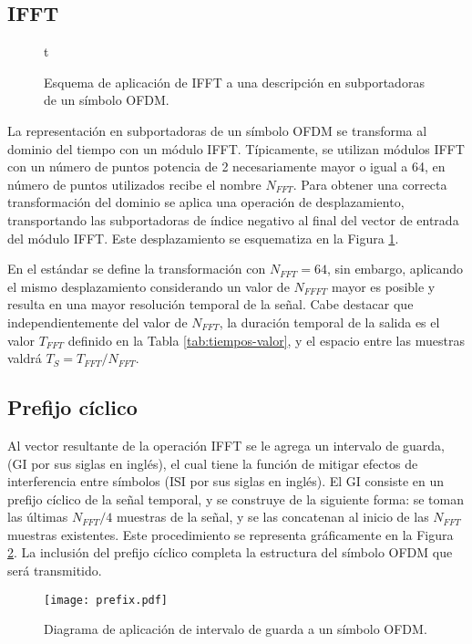 \subsection{IFFT}
\label{Ss:ch2-ifft}

\begin{figure}{t}
    \centering
    \hfill
    \hfill
    \caption{Esquema de aplicación de IFFT a una descripción en subportadoras de un símbolo OFDM.\label{fig:ifft}}
    \hfill
\end{figure}

La representación en subportadoras de un símbolo OFDM se transforma al dominio del tiempo con un módulo IFFT. Típicamente, se utilizan módulos IFFT con un número de puntos potencia de 2 necesariamente mayor o igual a 64, en número de puntos utilizados recibe el nombre $N_{FFT}$. Para obtener una correcta transformación del dominio se aplica una operación de desplazamiento, transportando las subportadoras de índice negativo al final del vector de entrada del módulo IFFT. Este desplazamiento se esquematiza en la Figura \ref{fig:ifft}.

En el estándar se define la transformación con $N_{FFT}=64$, sin embargo, aplicando el mismo desplazamiento considerando un valor de $N_{FFFT}$ mayor es posible y resulta en una mayor resolución temporal de la señal. Cabe destacar que independientemente del valor de $N_{FFT}$, la duración temporal de la salida es el valor $T_{FFT}$ definido en la Tabla \ref{tab:tiempos-valor}, y el espacio entre las muestras valdrá $T_S = T_{FFT}/N_{FFT}$.

\subsection{Prefijo cíclico}
\label{Ss:ch2-prefijo}

Al vector resultante de la operación IFFT se le agrega un intervalo de guarda, (GI por sus siglas en inglés), el cual tiene la función de mitigar efectos de interferencia entre símbolos (ISI por sus siglas en inglés). El GI consiste en un prefijo cíclico de la señal temporal, y se construye de la siguiente forma: se toman las últimas $N_{FFT}/4$ muestras de la señal, y se las concatenan al inicio de las $N_{FFT}$ muestras existentes. Este procedimiento se representa gráficamente en la Figura \ref{fig:prefijo}. La inclusión del prefijo cíclico completa la estructura del símbolo OFDM que será transmitido.
\begin{figure}[t]
    \centering{}\texttt{[image: prefix.pdf]}
    \caption{Diagrama de aplicación de intervalo de guarda a un símbolo OFDM.\label{fig:prefijo}}  
\end{figure}


